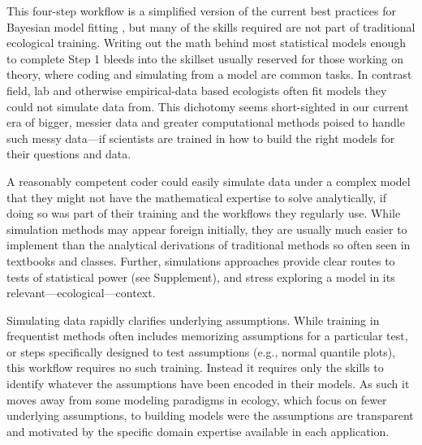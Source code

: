 \documentclass[11pt]{article}
\begin{document}
{This four-step workflow is a simplified version of the current best practices for Bayesian model fitting  \citep{betanworkflow,vandeschoot2021}, but many of the skills required are not part of traditional ecological training. Writing out the math behind most statistical models enough to complete Step 1 bleeds into the skillset usually reserved for those working on theory, where coding and simulating from a model are common tasks. In contrast field, lab and otherwise empirical-data based ecologists often fit models they could not simulate data from. This dichotomy seems short-sighted in our current era of bigger, messier data and greater computational methods poised to handle such messy data---if scientists are trained in how to build the right models for their questions and data. %

A reasonably competent coder could easily simulate data under a complex model that they might not have the mathematical expertise to solve analytically, if doing so was part of their training and the workflows they regularly use. While simulation methods may appear foreign initially, they are usually much easier to implement than the analytical derivations of traditional methods so often seen in textbooks and classes. Further, simulations approaches provide clear routes to tests of statistical power (see Supplement), and stress exploring a model in its relevant---ecological---context. %

Simulating data rapidly clarifies underlying assumptions. While training in frequentist methods often includes memorizing assumptions for a particular test, or steps specifically designed to test assumptions (e.g., normal quantile plots), this workflow requires no such training. Instead it requires only the skills to identify whatever the assumptions have been encoded in their
models. As such it moves away from some modeling paradigms in ecology, which focus on fewer underlying assumptions, to
building models were the assumptions are transparent and motivated by the specific domain expertise available in each
application. %

}
\end{document}
